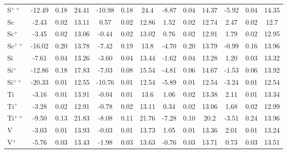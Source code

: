 \begin{longtable}{l!{\vrule width 0.25pt}ccc!{\vrule width 0.25pt}ccc!{\vrule width 0.25pt}ccc!{\vrule width 0.25pt}ccc}
S$^{++}$ & -12.49 & 0.18 & 24.41 & -10.98 & 0.18 & 24.4 & -8.87 & 0.04 & 14.37 & -5.92 & 0.04 & 14.35 \\
Sc & -2.43 & 0.02 & 13.11 & 0.57 & 0.02 & 12.86 & 1.52 & 0.02 & 12.74 & 2.47 & 0.02 & 12.7 \\
Sc$^+$ & -3.45 & 0.02 & 13.06 & -0.44 & 0.02 & 13.02 & 0.76 & 0.02 & 12.91 & 1.79 & 0.02 & 12.95 \\
Sc$^{++}$ & -16.02 & 0.20 & 13.78 & -7.42 & 0.19 & 13.8 & -4.70 & 0.20 & 13.79 & -0.99 & 0.16 & 13.96 \\
Si & -7.61 & 0.04 & 13.26 & -3.60 & 0.04 & 13.44 & -1.62 & 0.04 & 13.28 & 1.20 & 0.03 & 13.32 \\
Si$^+$ & -12.86 & 0.18 & 17.83 & -7.03 & 0.08 & 15.54 & -4.81 & 0.06 & 14.67 & -1.53 & 0.06 & 13.92 \\
Si$^{++}$ & -20.33 & 0.01 & 12.55 & -10.76 & 0.01 & 12.54 & -5.89 & 0.01 & 12.54 & -3.24 & 0.01 & 12.54 \\
Ti & -3.16 & 0.01 & 13.91 & -0.04 & 0.01 & 13.6 & 1.06 & 0.02 & 13.38 & 2.11 & 0.01 & 13.34 \\
Ti$^+$ & -3.28 & 0.02 & 12.91 & -0.78 & 0.02 & 13.11 & 0.34 & 0.02 & 13.06 & 1.68 & 0.02 & 12.99 \\
Ti$^{++}$ & -9.50 & 0.13 & 21.83 & -8.08 & 0.11 & 21.76 & -7.28 & 0.10 & 20.2 & -3.51 & 0.24 & 13.96 \\
V & -3.03 & 0.01 & 13.93 & -0.03 & 0.01 & 13.73 & 1.05 & 0.01 & 13.36 & 2.01 & 0.01 & 13.24 \\
V$^+$ & -5.76 & 0.03 & 13.43 & -1.98 & 0.03 & 13.63 & -0.76 & 0.03 & 13.71 & 0.73 & 0.03 & 13.51 \\
\end{longtable}


